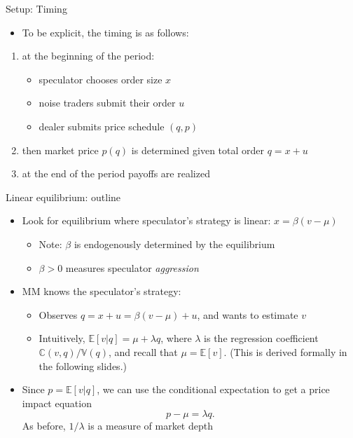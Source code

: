 \documentclass[english,10pt
,aspectratio=169
]{beamer}
\begin{document}
\begin{frame}{Setup: Timing}
	\begin{itemize}
		\item To be explicit, the timing is as follows:
	\end{itemize}
	\begin{enumerate}
		\item at the beginning of the period:
		\begin{itemize}
			\item speculator chooses order size $x$
			\item noise traders submit their order $u$
			\item dealer submits price schedule $(q,p)$
		\end{itemize}
		\item then market price $p(q)$ is determined given total order $q=x+u$
		\item at the end of the period payoffs are realized
	\end{enumerate}
\end{frame}


\begin{frame}{Linear equilibrium: outline}
\begin{itemize}
	\item Look for equilibrium where speculator's strategy is linear: \alert{$x=\beta(v-\mu)$}
	\begin{itemize}
		\item Note: $\beta$ is endogenously determined by the equilibrium
		\item $\beta>0$ measures speculator \textit{aggression}
	\end{itemize}
	\item MM knows the speculator's strategy:
	\begin{itemize}
		\item Observes $q=x+u=\beta(v-\mu)+u$, and wants to \alert{estimate $v$}
		\item Intuitively, \alert{$\mathbb{E}[v|q] = \mu + \lambda  q$}, where $\lambda $ is the regression coefficient $\mathbb{C}(v,q)/\mathbb{V}(q)$, and recall that $\mu=\mathbb{E}[v]$. (This is derived formally in the following slides.)
	\end{itemize}
	\item Since $p=\mathbb{E}[v|q]$, we can use the conditional expectation to get a price impact equation 
	\[
	p-\mu=\lambda q.
	\]
	As before, $1/\lambda$ is a measure of market depth
\end{itemize}
\end{frame}
\end{document}

